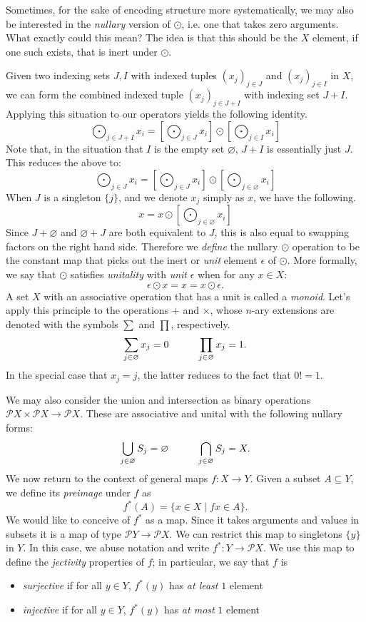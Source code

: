 Sometimes, for the sake of encoding structure more systematically, we may also be interested in the \emph{nullary} version of $\odot$, i.e. one that takes zero arguments. What exactly could this mean? The idea is that this should be the $X$ element, if one such exists, that is inert under $\odot$. 

Given two indexing sets $J,I$ with indexed tuples $(x_j)_{j\in J}$ and $(x_j)_{j\in I}$ in $X$, we can form the combined indexed tuple $(x_j)_{j\in J+I}$ with indexing set $J+I$. Applying this situation to our operators yields the following identity.
\[\bigodot_{j\in J+I}x_i=\left[\bigodot_{j\in J}x_i\right]\odot \left[\bigodot_{j\in I}x_i\right]\]
Note that, in the situation that $I$ is the empty set $\varnothing$, $J+I$ is essentially just $J$. This reduces the above to:
\[\bigodot_{j\in J}x_i=\left[\bigodot_{j\in J}x_i\right]\odot \left[\bigodot_{j\in \varnothing}x_i\right]\]
When $J$ is a singleton $\{j\}$, and we denote $x_j$ simply as $x$, we have the following.
\[x=x\odot\left[\bigodot_{j\in \varnothing}x_i\right]\]
Since $J+\varnothing$ and $\varnothing+J$ are both equivalent to $J$, this is also equal to swapping factors on the right hand side. Therefore we \emph{define} the nullary $\odot$ operation to be the constant map that picks out the inert or \emph{unit} element $\epsilon$ of $\odot$. More formally, we say that $\odot$ satisfies \emph{unitality} with \emph{unit} $\epsilon$ when for any $x\in X$:
\[\epsilon\odot x = x = x \odot\epsilon.\]
A set $X$ with an associative operation that has a unit is called a \emph{monoid}.
Let's apply this principle to the operations $+$ and $\times$, whose $n$-ary extensions are denoted with the symbols $\sum$ and $\prod$, respectively.
\[\sum_{j\in\varnothing}x_j=0 \hspace{10 mm} \prod_{j\in\varnothing}x_j=1.\]
In the special case that $x_j=j$, the latter reduces to the fact that $0!=1$.

We may also consider the union and intersection as binary operations $\mathcal{P}X\times\mathcal{P}X\to\mathcal{P}X$. These are associative and unital with the following nullary forms:
\[\bigcup_{j\in\varnothing}S_j=\varnothing \hspace{10 mm} \bigcap_{j\in\varnothing}S_j=X.\]
We now return to the context of general maps $f:X\to Y$. Given a subset $A\subseteq Y$, we define its \emph{preimage} under $f$ as
\[f^*(A)=\{x\in X\mid fx\in A\}.\]
We would like to conceive of $f^*$ as a map. Since it takes arguments and values in subsets it is a map of type $\mathcal{P}Y\to\mathcal{P}X$. We can restrict this map to singletons $\{y\}$ in $Y$. In this case, we abuse notation and write $f^*:Y\to\mathcal{P}X$. We use this map to define the \emph{jectivity} properties of $f$; in particular, we say that $f$ is
\begin{itemize}
    \item \emph{surjective} if for all $y\in Y$, $f^*(y)$ has \emph{at least} $1$ element
    \item \emph{injective} if for all $y\in Y$, $f^*(y)$ has \emph{at most} $1$ element
    \end{itemize}

